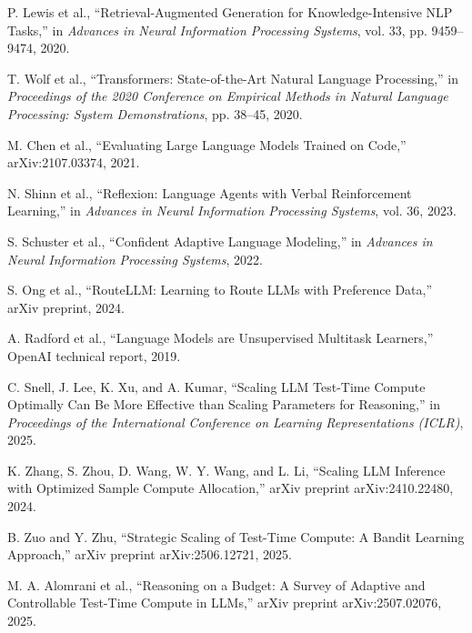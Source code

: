 \documentclass[12pt,a4paper,titlepage]{report}
\begin{document}
\begin{enumerate}[label={[\arabic*]}, leftmargin=*, itemsep=0.45em, align=left]
\item P. Lewis et al., ``Retrieval-Augmented Generation for Knowledge-Intensive NLP Tasks,'' in \textit{Advances in Neural Information Processing Systems}, vol. 33, pp. 9459--9474, 2020.

\item T. Wolf et al., ``Transformers: State-of-the-Art Natural Language Processing,'' in \textit{Proceedings of the 2020 Conference on Empirical Methods in Natural Language Processing: System Demonstrations}, pp. 38--45, 2020.

\item M. Chen et al., ``Evaluating Large Language Models Trained on Code,'' arXiv:2107.03374, 2021.

\item N. Shinn et al., ``Reflexion: Language Agents with Verbal Reinforcement Learning,'' in \textit{Advances in Neural Information Processing Systems}, vol. 36, 2023.

\item S. Schuster et al., ``Confident Adaptive Language Modeling,'' in \textit{Advances in Neural Information Processing Systems}, 2022.

\item S. Ong et al., ``RouteLLM: Learning to Route LLMs with Preference Data,'' arXiv preprint, 2024.

\item A. Radford et al., ``Language Models are Unsupervised Multitask Learners,'' OpenAI technical report, 2019.

\item C. Snell, J. Lee, K. Xu, and A. Kumar, ``Scaling LLM Test-Time Compute Optimally Can Be More Effective than Scaling Parameters for Reasoning,'' in \textit{Proceedings of the International Conference on Learning Representations (ICLR)}, 2025. 

\item K. Zhang, S. Zhou, D. Wang, W. Y. Wang, and L. Li, ``Scaling LLM Inference with Optimized Sample Compute Allocation,'' arXiv preprint arXiv:2410.22480, 2024. 

\item B. Zuo and Y. Zhu, ``Strategic Scaling of Test-Time Compute: A Bandit Learning Approach,'' arXiv preprint arXiv:2506.12721, 2025. 

\item M. A. Alomrani et al., ``Reasoning on a Budget: A Survey of Adaptive and Controllable Test-Time Compute in LLMs,'' arXiv preprint arXiv:2507.02076, 2025. 


\end{enumerate}
\end{document}
